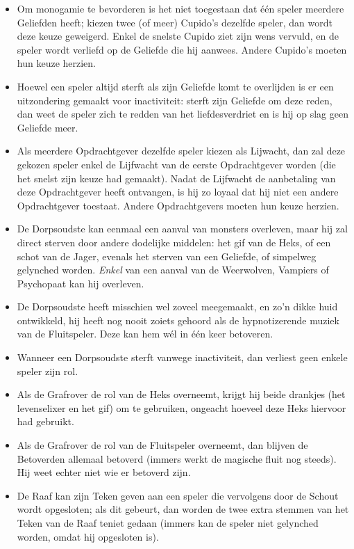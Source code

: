 \documentclass[12pt]{article}
\begin{document}
    \begin{itemize}
  	\item Om monogamie te bevorderen is het niet toegestaan dat \'e\'en speler meerdere Geliefden heeft; kiezen twee (of meer) Cupido's dezelfde speler, dan wordt deze keuze geweigerd. Enkel de snelste Cupido ziet zijn wens vervuld, en de speler wordt verliefd op de Geliefde die hij aanwees. Andere Cupido's moeten hun keuze herzien.
  	\item Hoewel een speler altijd sterft als zijn Geliefde komt te overlijden is er een uitzondering gemaakt voor inactiviteit: sterft zijn Geliefde om deze reden, dan weet de speler zich te redden van het liefdesverdriet en is hij op slag geen Geliefde meer.
  	\item Als meerdere Opdrachtgever dezelfde speler kiezen als Lijwacht, dan zal deze gekozen speler enkel de Lijfwacht van de eerste Opdrachtgever worden (die het snelst zijn keuze had gemaakt). Nadat de Lijfwacht de aanbetaling van deze Opdrachtgever heeft ontvangen, is hij zo loyaal dat hij niet een andere Opdrachtgever toestaat. Andere Opdrachtgevers moeten hun keuze herzien.
  	\item De Dorpsoudste kan eenmaal een aanval van monsters overleven, maar hij zal direct sterven door andere dodelijke middelen: het gif van de Heks, of een schot van de Jager, evenals het sterven van een Geliefde, of simpelweg gelynched worden. \emph{Enkel} van een aanval van de Weerwolven, Vampiers of Psychopaat kan hij overleven.
  	\item De Dorpsoudste heeft misschien wel zoveel meegemaakt, en zo'n dikke huid ontwikkeld, hij heeft nog nooit zoiets gehoord als de hypnotizerende muziek van de Fluitspeler. Deze kan hem w\'el in \'e\'en keer betoveren.
  	\item Wanneer een Dorpsoudste sterft vanwege inactiviteit, dan verliest geen enkele speler zijn rol.
  	\item Als de Grafrover de rol van de Heks overneemt, krijgt hij beide drankjes (het levenselixer en het gif) om te gebruiken, ongeacht hoeveel deze Heks hiervoor had gebruikt.
  	\item Als de Grafrover de rol van de Fluitspeler overneemt, dan blijven de Betoverden allemaal betoverd (immers werkt de magische fluit nog steeds). Hij weet echter niet wie er betoverd zijn.
  	\item De Raaf kan zijn Teken geven aan een speler die vervolgens door de Schout wordt opgesloten; als dit gebeurt, dan worden de twee extra stemmen van het Teken van de Raaf teniet gedaan (immers kan de speler niet gelynched worden, omdat hij opgesloten is).

\end{itemize}
\end{document}
